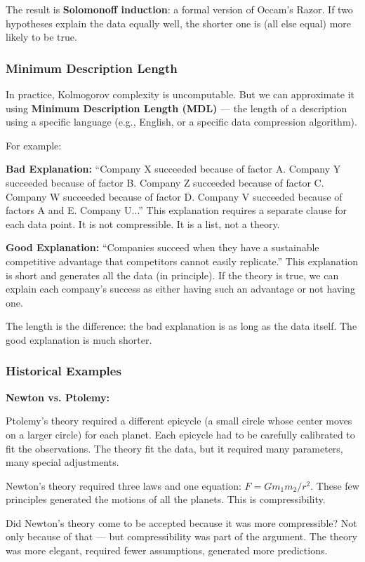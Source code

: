 \documentclass[11pt,letterpaper]{article}
\begin{document}
The result is \textbf{Solomonoff induction}: a formal version of Occam's Razor. If two hypotheses explain the data equally well, the shorter one is (all else equal) more likely to be true.

\subsubsection*{Minimum Description Length}

In practice, Kolmogorov complexity is uncomputable. But we can approximate it using \textbf{Minimum Description Length (MDL)} — the length of a description using a specific language (e.g., English, or a specific data compression algorithm).

For example:

\textbf{Bad Explanation:} ``Company X succeeded because of factor A. Company Y succeeded because of factor B. Company Z succeeded because of factor C. Company W succeeded because of factor D. Company V succeeded because of factors A and E. Company U...'' This explanation requires a separate clause for each data point. It is not compressible. It is a list, not a theory.

\textbf{Good Explanation:} ``Companies succeed when they have a sustainable competitive advantage that competitors cannot easily replicate.'' This explanation is short and generates all the data (in principle). If the theory is true, we can explain each company's success as either having such an advantage or not having one.

The length is the difference: the bad explanation is as long as the data itself. The good explanation is much shorter.

\subsubsection*{Historical Examples}

\textbf{Newton vs. Ptolemy:}

Ptolemy's theory required a different epicycle (a small circle whose center moves on a larger circle) for each planet. Each epicycle had to be carefully calibrated to fit the observations. The theory fit the data, but it required many parameters, many special adjustments.

Newton's theory required three laws and one equation: $F = Gm_1m_2/r^2$. These few principles generated the motions of all the planets. This is compressibility.

Did Newton's theory come to be accepted because it was more compressible? Not only because of that — but compressibility was part of the argument. The theory was more elegant, required fewer assumptions, generated more predictions.
\end{document}
